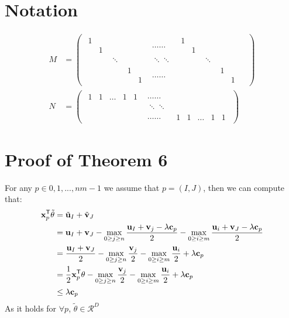 \section{Notation}
\begin{align}
M &= 
\begin{pmatrix}
\begin{matrix} 1&\\&1 \end{matrix}& & &\dots\dots&\begin{matrix} 1&\\&1 \end{matrix}& &  \\
&\ddots& & \ddots\ddots & & \ddots & & \\
& &\begin{matrix} 1&\\&1 \end{matrix}& \dots\dots& & &\begin{matrix} 1&\\&1 \end{matrix}
\end{pmatrix}\\
N &= 
\begin{pmatrix}
\begin{matrix} 1&1&\dots&1&1\end{matrix} &\dots\dots \\
&\ddots\ddots&\\
&\dots\dots & \begin{matrix} 1&1&\dots&1&1\end{matrix}
\end{pmatrix}
\end{align}

\section{Proof of Theorem 6}
For any $p \in {0,1,...,nm -1}$ we assume that $p = (I,J)$, then we can compute that:
 \begin{equation}
\begin{split} 
\mathbf{x}_p^{\mathsf T}\tilde{\theta} &= \tilde{\mathbf u}_{I} + \tilde{\mathbf v}_J \\
				       &= {\mathbf u}_{I} + {\mathbf v}_J -  \max_{0\geq j\geq n} \frac{{\mathbf u}_I +{\mathbf v}_j - \lambda \mathbf c_{p}}{2} -  \max_{0 \geq i \geq m} \frac{{\mathbf u}_i +{\mathbf v}_J - \lambda \mathbf c_{p}}{2}\\
				       &= \frac{{\mathbf u}_{I} + {\mathbf v}_J}{2} -  \max_{0\geq j\geq n} \frac{{\mathbf v}_j}{2} -  \max_{0 \geq i \geq m} \frac{{\mathbf u}_i }{2} + \lambda \mathbf c_{p}\\
				       &= \frac{1}{2}\mathbf{x}_p^{\mathsf T}{\theta}  - \max_{0\geq j\geq n} \frac{{\mathbf v}_j}{2} -  \max_{0 \geq i \geq m} \frac{{\mathbf u}_i }{2}  +\lambda \mathbf c_{p} \\
				       &\leq \lambda \mathbf c_{p} 
 \end{split} 
\end{equation}
As it holds for $\forall p$, $\tilde{\theta} \in \mathcal{R}^{D}$

